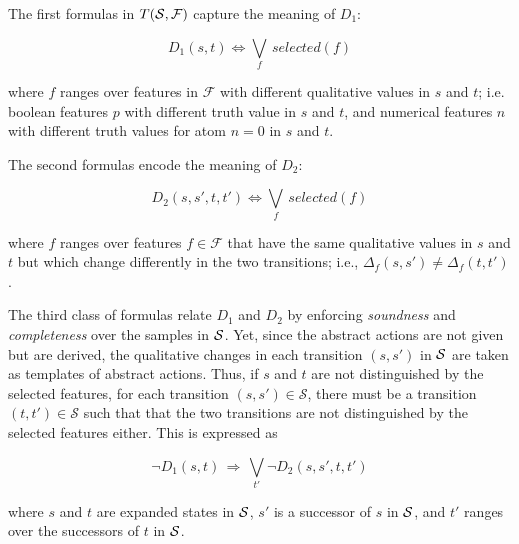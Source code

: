 \documentclass[letterpaper]{article} %
\begin{document}
\medskip


\noindent The  first  formulas in $T({\cal S,\cal F})$ capture the meaning of $D_1$:
  
\begin{equation}
  D_1(s, t) \Leftrightarrow \bigvee_{f} \, selected(f)
  \label{d1}
\end{equation}

\noindent where $f$ ranges over features in $\mathcal{F}$ with  different qualitative values in $s$ and $t$; i.e.
boolean features $p$ with different truth value in $s$ and $t$, and numerical features $n$ with different truth values
for atom $n=0$ in $s$ and $t$. 

\noindent The second formulas encode  the meaning of $D_2$:

\begin{equation}
  D_2(s, s', t, t') \Leftrightarrow \bigvee_f \,  selected(f)
\end{equation}

\noindent where $f$  ranges over features $f \in \mathcal{F}$ that have the same qualitative values in $s$ and $t$
but which change differently in the two transitions; i.e.,  $\Delta_f(s, s') \neq \Delta_f(t, t')$.

The third  class of formulas relate $D_1$ and $D_2$ by  enforcing  \emph{soundness} and \emph{completeness} over  the samples in ${\cal S}$.
Yet, since the abstract actions  are not given but are derived, the qualitative changes in each  transition $(s,s')$ in ${\cal S}$
are  taken as templates  of abstract actions. Thus, if $s$ and $t$ are not distinguished by the selected features, 
for each transition $(s, s') \in \mathcal{S}$, there must be a transition $(t, t') \in \mathcal{S}$
such that that the two transitions are not distinguished by the selected features either.
This is expressed as

\begin{equation}
  \neg D_1(s, t) \, \Rightarrow \, \bigvee_{t'} \neg D_2(s, s', t, t')
  \label{bridge1}
\end{equation}

\noindent where $s$ and $t$ are expanded states in  ${\cal S}$, $s'$ is a successor of $s$ in ${\cal S}$,
and $t'$ ranges over the successors of $t$ in ${\cal S}$.
\end{document}
